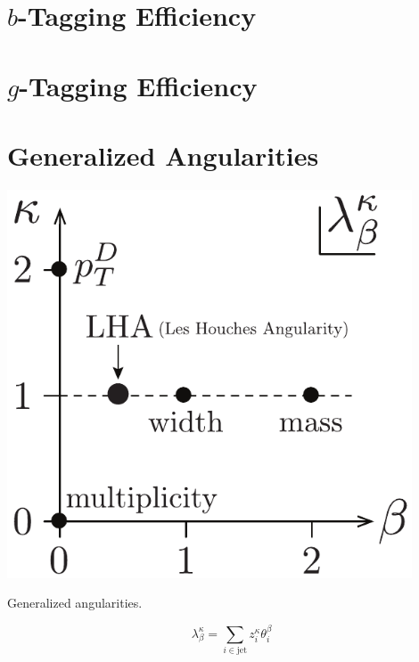 \section{$b$-Tagging Efficiency}
\label{sec:q:b_tagging_effiency}

    



\section{$g$-Tagging Efficiency}
\label{sec:q:g_tagging_effiency}



\newpage

\section{Generalized Angularities}
\label{sec:q:generalized_angularities}


\begin{marginfigure}
  \centerfloat
  \includegraphics[width=0.9\textwidth]{figures/LHA/LHA.pdf}
  \caption[Generalized Angularities]
          {Generalized angularities.} 
  \label{fig:q:LHA}
\end{marginfigure}

\begin{equation}
  \lambda_\beta^\kappa = \sum_{i \in \mathrm{jet}} z_i^\kappa \theta_i^\beta
\end{equation}


